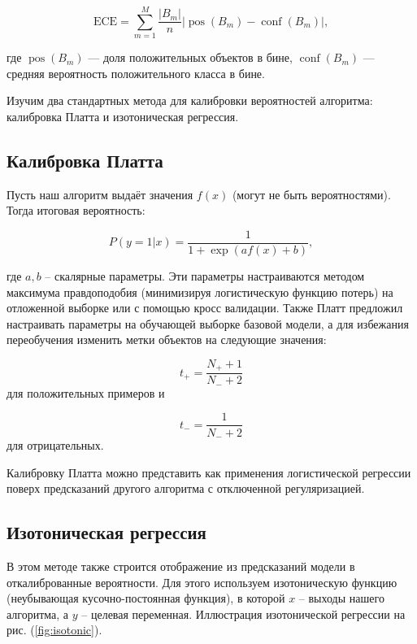 \documentclass[12pt,a4paper]{article}
\begin{document}
$$
\mathrm{ECE}=\sum_{m=1}^M \frac{\left|B_m\right|}{n}\left|\operatorname{pos}\left(B_m\right)-\operatorname{conf}\left(B_m\right)\right|,
$$

где $\operatorname{pos}(B_m)$ — доля положительных объектов в бине, $\operatorname{conf}(B_m)$ — средняя вероятность положительного класса в бине.

Изучим два стандартных метода для калибровки вероятностей алгоритма: калибровка Платта и изотоническая регрессия.

\subsection{Калибровка Платта}

Пусть наш алгоритм выдаёт значения $f(x)$ (могут не быть вероятностями). Тогда итоговая вероятность:

$$P(y = 1 | x) = \frac{1}{1+\exp (af(x) + b)},$$

где $a, b$ -- скалярные параметры. Эти параметры настраиваются методом максимума правдоподобия (минимизируя логистическую функцию потерь) на отложенной выборке или с помощью кросс валидации. Также Платт предложил настраивать параметры на обучающей выборке базовой модели, а для избежания переобучения изменить метки объектов на следующие значения:

$$t_{+} = \frac{N_{+} + 1}{N_{-} + 2}$$ для положительных примеров и

$$t_{-} = \frac{1}{N_{-} + 2}$$ для отрицательных.

Калибровку Платта можно представить как применения логистической регрессии поверх предсказаний другого алгоритма с отключенной регуляризацией.


\subsection{Изотоническая регрессия}

В этом методе также строится отображение из предсказаний модели в откалиброванные вероятности. Для этого используем изотоническую функцию (неубывающая кусочно-постоянная функция), в которой $x$ -- выходы нашего алгоритма, а $y$ -- целевая переменная. Иллюстрация изотонической регрессии на рис. (\ref{fig:isotonic}).
\end{document}
